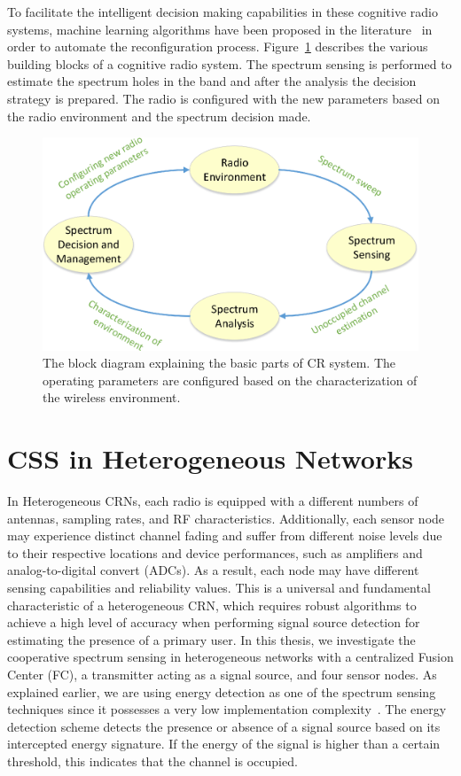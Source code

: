To facilitate the intelligent decision making capabilities in these cognitive radio systems, machine learning algorithms have been proposed in the literature~\cite{barker2008mission,haykin2005cognitive,newman2007cognitive,newman2008population} in order to automate the reconfiguration process. Figure~\ref{cograd} describes the various building blocks of a cognitive radio system. The spectrum sensing is performed to estimate the spectrum holes in the band and after the analysis the decision strategy is prepared. The radio is configured with the new parameters based on the radio environment and the spectrum decision made.  

\begin{figure}[ht!]
	\centering
	\includegraphics[width=\textwidth,keepaspectratio]{images/Gill/figs/cognitive_radio.eps}
    \caption{The block diagram explaining the basic parts of CR system. The operating parameters are configured based on the characterization of the wireless environment.} 
\label{cograd}      
\end{figure}

\section{CSS in Heterogeneous Networks}
In Heterogeneous CRNs, each radio is equipped with a different numbers of antennas, sampling rates, and RF characteristics. Additionally, each sensor node may experience distinct channel fading and suffer from different noise levels due to their respective locations and device performances, such as amplifiers and analog-to-digital convert (ADCs).  As a result, each node may have different sensing capabilities and reliability values. This is a universal and fundamental characteristic of a heterogeneous CRN, which requires robust algorithms to achieve a high level of accuracy when performing signal source detection for estimating the presence of a primary user\cite{arhtn13}. In this thesis, we investigate the cooperative spectrum sensing in heterogeneous networks with a centralized Fusion Center (FC), a transmitter acting as a signal source, and four sensor nodes. As explained earlier, we are using energy detection as one of the spectrum sensing techniques since it possesses a very low implementation complexity~\cite{arhtn4}. The energy detection scheme detects the presence or absence of a signal source based on its intercepted energy signature. If the energy of the signal is higher than a certain threshold, this indicates that the channel is occupied. 

